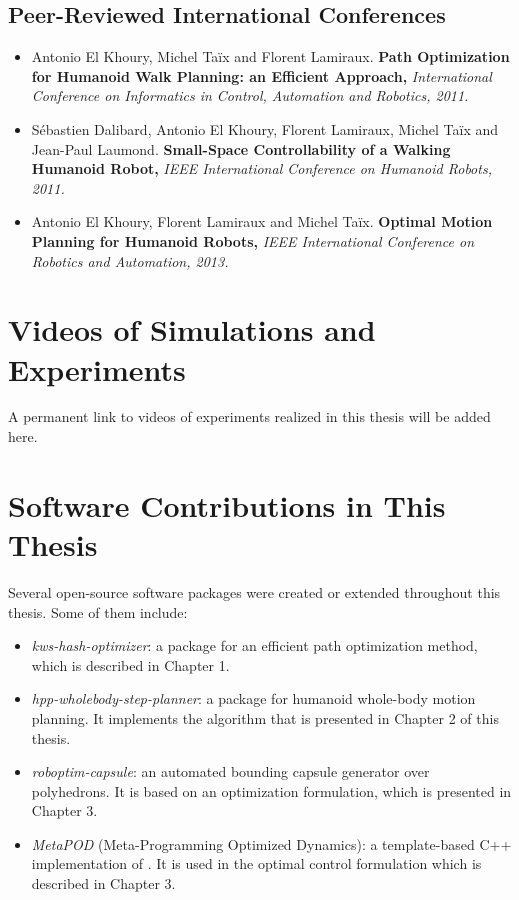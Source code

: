 \subsection*{Peer-Reviewed International Conferences}
\begin{itemize}
\item Antonio El Khoury, Michel Ta\"ix and Florent
  Lamiraux. \textbf{Path Optimization for Humanoid Walk Planning: an
    Efficient Approach,} \textit{International Conference on
    Informatics in Control, Automation and Robotics, 2011.}

\item S\'ebastien Dalibard, Antonio El Khoury, Florent Lamiraux,
  Michel Ta\"ix and Jean-Paul Laumond. \textbf{Small-Space
    Controllability of a Walking Humanoid Robot,} \textit{IEEE
    International Conference on Humanoid Robots, 2011.}

\item Antonio El Khoury, Florent Lamiraux and Michel
  Ta\"ix. \textbf{Optimal Motion Planning for Humanoid Robots,}
  \textit{IEEE International Conference on Robotics and Automation,
    2013.}
\end{itemize}

\section{Videos of Simulations and Experiments}


A permanent link to videos of experiments realized in this thesis will
be added here.

\section{Software Contributions in This Thesis}

Several open-source software packages were created or extended
throughout this thesis. Some of them include:

\begin{itemize}
  \item \textit{kws-hash-optimizer}: a package for an efficient path
    optimization method, which is described in Chapter 1.
  \item \textit{hpp-wholebody-step-planner}: a package for humanoid whole-body
    motion planning. It implements the algorithm that is presented in
    Chapter 2 of this thesis.
  \item \textit{roboptim-capsule}: an automated bounding capsule generator over
    polyhedrons. It is based on an optimization formulation, which is
    presented in Chapter 3.
  \item \textit{MetaPOD} (Meta-Programming Optimized Dynamics): a
    template-based C++ implementation of \cite{feat08}. It is used in
    the optimal control formulation which is described in Chapter 3.
\end{itemize}
